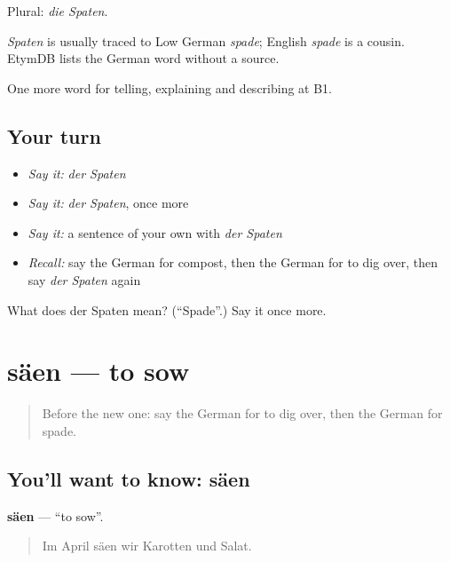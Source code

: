 Plural: \emph{die Spaten}.

\begin{cousinweb}
\emph{Spaten} is usually traced to Low German \emph{spade}; English \emph{spade} is a cousin. EtymDB lists the German word without a source.
\end{cousinweb}

\begin{grammarlens}[title={What you've built}]
One more word for telling, explaining and describing at B1.
\end{grammarlens}

\subsection*{Your turn}
\begin{itemize}
\raggedright
  \item \emph{Say it:} \emph{der Spaten}
  \item \emph{Say it:} \emph{der Spaten}, once more
  \item \emph{Say it:} a sentence of your own with \emph{der Spaten}
  \item \emph{Recall:} say the German for compost, then the German for to dig over, then say \emph{der Spaten} again
\end{itemize}

\begin{tcolorbox}[breakable,colback=teal!4,colframe=teal!35!black,title={Before you move on}]
What does der Spaten mean? (\textquotedblleft{}Spade\textquotedblright{}.) Say it once more.
\end{tcolorbox}
\section[säen]{säen — to sow}

\label{lesson:GE-C504-saeen}



\begin{quote}
Before the new one: say the German for to dig over, then the German for spade.
\end{quote}

\subsection*{You'll want to know: säen}
\textbf{säen} — \textquotedblleft{}to sow\textquotedblright{}.

\begin{quote}
Im April säen wir Karotten und Salat.
\end{quote}

